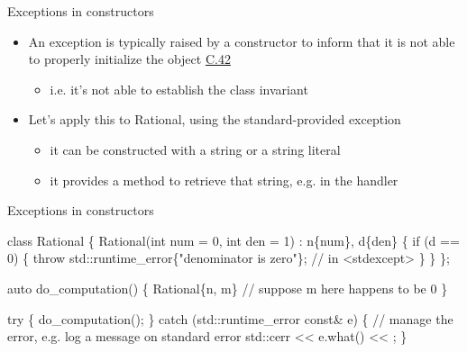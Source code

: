 \begin{frame}[fragile]{Exceptions in constructors}

  \begin{itemize}
  \item An exception is typically raised by a constructor to inform that it is
    not able to properly initialize the object
    \href{https://isocpp.github.io/CppCoreGuidelines/CppCoreGuidelines#c42-if-a-constructor-cannot-construct-a-valid-object-throw-an-exception}{C.42}
    \begin{itemize}
    \item i.e. it's not able to establish the class invariant
    \end{itemize}
  \item Let's apply this to Rational, using the standard-provided exception 
    \begin{itemize}
    \item it can be constructed with a string or a string literal
    \item it provides a  method to retrieve that string, e.g. in
      the handler
    \end{itemize}
  \end{itemize}

\end{frame}

\begin{frame}[fragile]{Exceptions in constructors \insertcontinuationtext}

    \begin{codeblock}
class Rational \{
  \ddd
  Rational(int num = 0, int den = 1) : n\{num\}, d\{den\} \{
    if (d == 0) \{
      \alert{throw} std::runtime_error\{"denominator is zero"\}; // in <stdexcept>
    \}
    \ddd
  \}
\};

auto do_computation() \{
  \ddd
  Rational\{n, m\} // suppose m here happens to be 0
  \ddd  
\}

\alert{try} \{
  do_computation();
  \ddd
\} \alert{catch} (std::runtime_error const& e) \{
  // manage the error, e.g. log a message on standard error
  std::cerr << e.what() << \bslashn;
\}\end{codeblock}

\end{frame}

